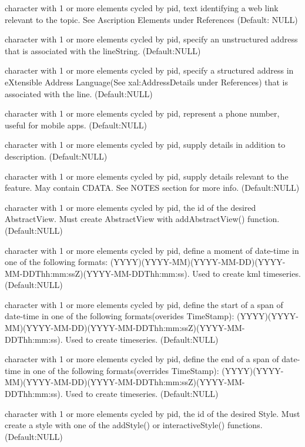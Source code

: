 \documentclass[a4paper]{book}
\begin{document}
\begin{Arguments}
\begin{ldescription}
\item[\code{atomlinkhref}] character with 1 or more elements cycled by pid, text identifying a web link relevant to the topic. See Ascription Elements under References (Default: NULL) 
\item[\code{address}] character with 1 or more elements cycled by pid, specify an unstructured address that is associated with the lineString. (Default:NULL) 
\item[\code{xalAddressDetails}] character with 1 or more elements cycled by pid, specify a structured address in eXtensible Address Language(See xal:AddressDetails under References) that is associated with the line. (Default:NULL) 
\item[\code{phoneNumber}]  character with 1 or more elements cycled by pid, represent a phone number, useful for mobile apps. (Default:NULL) 
\item[\code{Snippet}] character with 1 or more elements cycled by pid, supply details in addition to description. (Default:NULL)
\item[\code{description}] character with 1 or more elements cycled by pid, supply details relevant to the feature. May contain CDATA. See NOTES section for more info. (Default:NULL)
\item[\code{AbstractView}] character with 1 or more elements cycled by pid, the id of the desired AbstractView. Must create AbstractView with addAbstractView() function. (Default:NULL)
\item[\code{TimeStamp}]  character with 1 or more elements cycled by pid, define a moment of date-time in one of the following formats: (YYYY)(YYYY-MM)(YYYY-MM-DD)(YYYY-MM-DDThh:mm:ssZ)(YYYY-MM-DDThh:mm:ss). Used to create kml timeseries. (Default:NULL)
\item[\code{TimeSpanStart}]  character with 1 or more elements cycled by pid, define the start of a span of date-time in one of the following formats(overides TimeStamp): (YYYY)(YYYY-MM)(YYYY-MM-DD)(YYYY-MM-DDThh:mm:ssZ)(YYYY-MM-DDThh:mm:ss). Used to create timeseries. (Default:NULL)
\item[\code{TimeSpanEnd}]  character with 1 or more elements cycled by pid, define the end of a span of date-time in one of the following formats(overrides TimeStamp): (YYYY)(YYYY-MM)(YYYY-MM-DD)(YYYY-MM-DDThh:mm:ssZ)(YYYY-MM-DDThh:mm:ss). Used to create timeseries. (Default:NULL) 
\item[\code{styleUrl}] character with 1 or more elements cycled by pid, the id of the desired Style. Must create a style with one of the addStyle() or interactiveStyle() functions. (Default:NULL)

\end{ldescription}
\end{Arguments}
\end{document}
